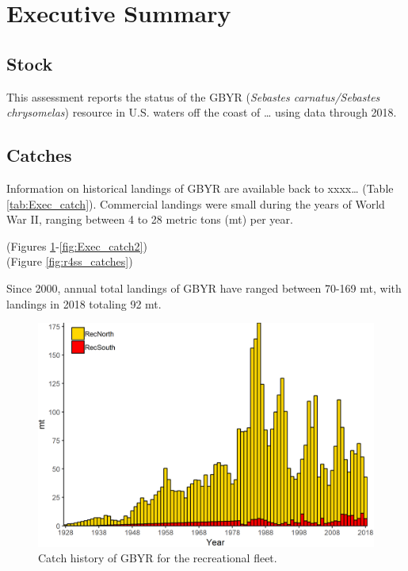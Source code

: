\documentclass[12pt,]{article}
\begin{document}
{
\setcounter{tocdepth}{4}
\tableofcontents
}
\setlength{\parskip}{5mm plus1mm minus1mm} \pagebreak

\setcounter{page}{1} \renewcommand{\thefigure}{\alph{figure}}
\renewcommand{\thetable}{\alph{table}}

\section*{Executive Summary}\label{executive-summary}

\subsection*{Stock}\label{stock}

This assessment reports the status of the GBYR
(\emph{Sebastes carnatus/Sebastes chrysomelas}) resource in U.S. waters
off the coast of \ldots{} using data through 2018.

\subsection*{Catches}\label{catches}

Information on historical landings of GBYR are available back to
xxxx\ldots{} (Table \ref{tab:Exec_catch}). Commercial landings were
small during the years of World War II, ranging between 4 to 28 metric
tons (mt) per year.

(Figures \ref{fig:Exec_catch1}-\ref{fig:Exec_catch2})\\
(Figure \ref{fig:r4ss_catches})

Since 2000, annual total landings of GBYR have ranged between 70-169 mt,
with landings in 2018 totaling 92 mt.

\FloatBarrier

\begin{figure}
\centering
\includegraphics{Figures/rec_exec.png}
\caption{Catch history of GBYR for the recreational fleet.
\label{fig:Exec_catch1}}
\end{figure}
\end{document}

